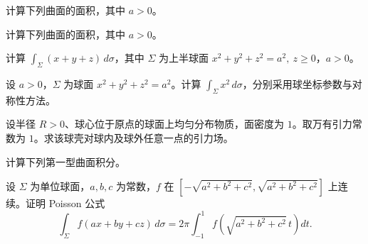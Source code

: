 \noindent\begin{minipage}{\textwidth}
计算下列曲面的面积，其中 $a>0$。
\end{minipage}\par\vfill
\noindent\begin{minipage}{\textwidth}
计算下列曲面的面积，其中 $a>0$。
\end{minipage}\par\vfill
\newpage
\noindent\begin{minipage}{\textwidth}
计算 $\int_\Sigma(x+y+z)\,d\sigma$，其中 $\Sigma$ 为上半球面 $x^2+y^2+z^2=a^2,\ z\ge0$，$a>0$。
\end{minipage}\par\vfill
\noindent\begin{minipage}{\textwidth}
设 $a>0$，$\Sigma$ 为球面 $x^2+y^2+z^2=a^2$。计算 $\int_\Sigma x^2\,d\sigma$，分别采用球坐标参数与对称性方法。
\end{minipage}\par\vfill
\noindent\begin{minipage}{\textwidth}
设半径 $R>0$、球心位于原点的球面上均匀分布物质，面密度为 $1$。取万有引力常数为 $1$。求该球壳对球内及球外任意一点的引力场。
\end{minipage}\par\vfill
\newpage
\noindent\begin{minipage}{\textwidth}
计算下列第一型曲面积分。
\end{minipage}\par\vfill
\noindent\begin{minipage}{\textwidth}
设 $\Sigma$ 为单位球面，$a,b,c$ 为常数，$f$ 在 $[-\sqrt{a^2+b^2+c^2},\sqrt{a^2+b^2+c^2}]$ 上连续。证明 Poisson 公式\[\int_\Sigma f(ax+by+cz)\,d\sigma=2\pi\int_{-1}^1 f\!\left(\sqrt{a^2+b^2+c^2}\,t\right)dt.\]
\end{minipage}\par\vfill
